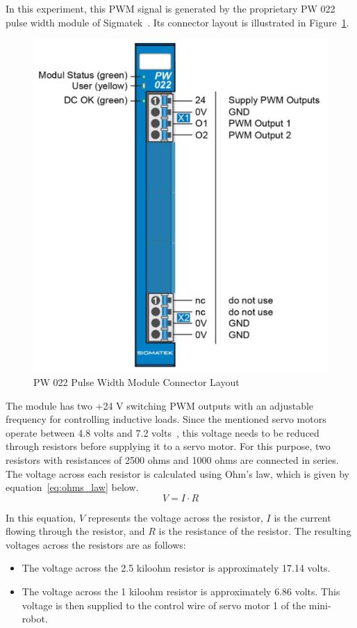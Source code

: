 \documentclass[MMR,Master,english]{style/twbook}
\begin{document}
\noindent In this experiment, this PWM signal is generated by the proprietary PW 022 pulse width module of Sigmatek~\cite{DigitalOutputSIGMATEK}. Its connector layout is illustrated in Figure~\ref{fig:pw022_connectors}.

\begin{figure}[H]
	\centering
	\includegraphics[width=0.5\columnwidth]{img/experiment/pw022_connectors.png}
	\caption[PW 022 Pulse Width Module Connector Layout]{PW 022 Pulse Width Module Connector Layout~\cite{DigitalOutputSIGMATEK}}
	\label{fig:pw022_connectors}
\end{figure}

\noindent The module has two +24 V switching PWM outputs with an adjustable frequency for controlling inductive loads. Since the mentioned servo motors operate between 4.8 volts and 7.2 volts~\cite{MG996RServoMotor}, this voltage needs to be reduced through resistors before supplying it to a servo motor. For this purpose, two resistors with resistances of 2500 ohms and 1000 ohms are connected in series. The voltage across each resistor is calculated using Ohm's law, which is given by equation~\ref{eq:ohms_law} below.
\begin{equation}
	\label{eq:ohms_law}
	V = I \cdot R
\end{equation}

\noindent In this equation, \(V\) represents the voltage across the resistor, \(I\) is the current flowing through the resistor, and \(R\) is the resistance of the resistor. The resulting voltages across the resistors are as follows:

\begin{itemize}
	\item The voltage across the 2.5 kiloohm resistor is approximately 17.14 volts.
	\item The voltage across the 1 kiloohm resistor is approximately 6.86 volts. This voltage is then supplied to the control wire of servo motor 1 of the mini-robot.
\end{itemize}
\end{document}
